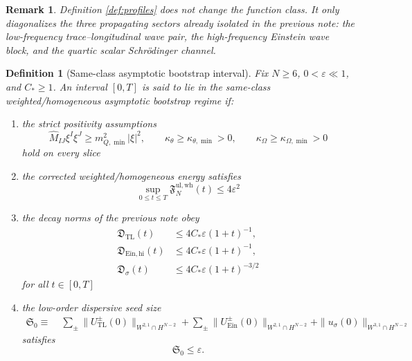 \documentclass[11pt]{article}
\newtheorem{definition}{Definition}
\newtheorem{remark}{Remark}
\begin{document}
\begin{remark}
Definition \ref{def:profiles} does not change the function class. It only diagonalizes the three propagating sectors already isolated in the previous note: the low-frequency trace--longitudinal wave pair, the high-frequency Einstein wave block, and the quartic scalar Schr\"odinger channel.
\end{remark}

\begin{definition}[Same-class asymptotic bootstrap interval]
\label{def:asymboot}
Fix \(N\ge 6\), \(0<\varepsilon\ll 1\), and \(C_\ast\ge 1\). An interval \([0,T]\) is said to lie in the \emph{same-class weighted/homogeneous asymptotic bootstrap regime} if:
\begin{enumerate}
    \item the strict positivity assumptions
    \begin{equation}
    \widehat M_{IJ}\xi^I\xi^J\ge m_{Q,\min}^2|\xi|^2,
    \qquad
    \kappa_\theta\ge \kappa_{\theta,\min}>0,
    \qquad
    \kappa_\Omega\ge \kappa_{\Omega,\min}>0
    \label{eq:strict}
    \end{equation}
    hold on every slice
    \item the corrected weighted/homogeneous energy satisfies
    \begin{equation}
    \sup_{0\le t\le T}\mathfrak F_N^{\mathrm{ul,wh}}(t)\le 4\varepsilon^2
    \label{eq:Fboot}
    \end{equation}
    \item the decay norms of the previous note obey
    \begin{align}
    \mathfrak D_{\mathrm{TL}}(t)
    &\le 4C_\ast\varepsilon(1+t)^{-1},
    \label{eq:DTLboot}
    \\
    \mathfrak D_{\mathrm{Ein,hi}}(t)
    &\le 4C_\ast\varepsilon(1+t)^{-1},
    \label{eq:DEinboot}
    \\
    \mathfrak D_\sigma(t)
    &\le 4C_\ast\varepsilon(1+t)^{-3/2}
    \label{eq:Dsigboot}
    \end{align}
    for all \(t\in[0,T]\)
    \item the low-order dispersive seed size
    \begin{align}
    \mathfrak S_0
    \equiv\;&
    \sum_{\pm}\|U_{\mathrm{TL}}^\pm(0)\|_{W^{2,1}\cap H^{N-2}}
    +
    \sum_{\pm}\|U_{\mathrm{Ein}}^\pm(0)\|_{W^{2,1}\cap H^{N-2}}
    +
    \|u_\sigma(0)\|_{W^{3,1}\cap H^{N-2}}
    \label{eq:S0}
    \end{align}
    satisfies
    \begin{equation}
    \mathfrak S_0 \le \varepsilon.
    \label{eq:S0small}
    \end{equation}
\end{enumerate}
\end{definition}
\end{document}
